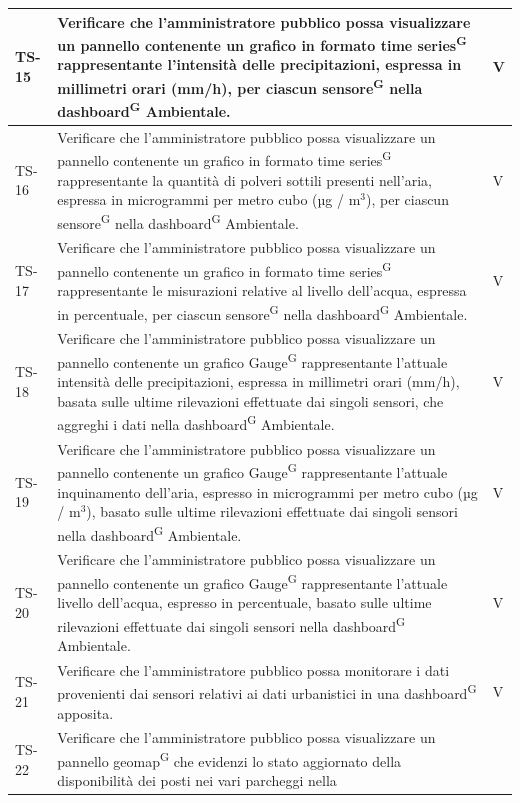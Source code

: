 \documentclass[8pt]{article}
\newcommand{\glossterm}[1]{#1\textsuperscript{G}} %
\begin{document}
\begin{longtable}{|>{\centering}p{2cm}|>{\RaggedRight}m{12cm}|>{\centering\arraybackslash}p{2cm}|}
    \hline
    TS-15 & Verificare che l'amministratore pubblico possa visualizzare un pannello contenente
    un grafico in formato \glossterm{time series} rappresentante l'intensità delle precipitazioni,
    espressa in millimetri orari (mm/h), per ciascun \glossterm{sensore} nella \glossterm{dashboard} Ambientale.
    & V \\
    \hline
    TS-16 & Verificare che l'amministratore pubblico possa visualizzare un pannello contenente
    un grafico in formato \glossterm{time series} rappresentante la quantità di polveri sottili presenti nell'aria,
    espressa in microgrammi per metro cubo (µg / $\mbox{m}^{\mbox{3}}$), per ciascun \glossterm{sensore} nella \glossterm{dashboard} Ambientale.
    & V \\
    \hline
    TS-17 & Verificare che l'amministratore pubblico possa visualizzare un pannello contenente
    un grafico in formato \glossterm{time series} rappresentante le misurazioni relative al livello dell'acqua,
    espressa in percentuale, per ciascun \glossterm{sensore} nella \glossterm{dashboard} Ambientale.
    & V \\
    \hline
    TS-18 & Verificare che l'amministratore pubblico possa visualizzare un pannello contenente
    un grafico \glossterm{Gauge} rappresentante l'attuale intensità delle precipitazioni,
    espressa in millimetri orari (mm/h), basata sulle ultime rilevazioni effettuate dai singoli sensori, che aggreghi i dati nella \glossterm{dashboard} Ambientale.
    & V \\
    \hline
    TS-19 & Verificare che l'amministratore pubblico possa visualizzare un pannello contenente
    un grafico \glossterm{Gauge} rappresentante l'attuale inquinamento dell'aria,
    espresso in microgrammi per metro cubo (µg / $\mbox{m}^{\mbox{3}}$), basato sulle ultime rilevazioni effettuate dai singoli sensori nella \glossterm{dashboard} Ambientale.
    & V \\
    \hline
    TS-20 & Verificare che l'amministratore pubblico possa visualizzare un pannello contenente
    un grafico \glossterm{Gauge} rappresentante l'attuale livello dell'acqua,
    espresso in percentuale, basato sulle ultime rilevazioni effettuate dai singoli sensori nella \glossterm{dashboard} Ambientale.
    & V \\
    \hline
    TS-21 & Verificare che l'amministratore pubblico possa monitorare i dati provenienti
    dai sensori relativi ai dati urbanistici in una \glossterm{dashboard} apposita.
    & V \\
    \hline
    TS-22 & Verificare che l'amministratore pubblico possa visualizzare un pannello \glossterm{geomap} che evidenzi lo stato aggiornato della disponibilità dei posti nei vari parcheggi nella

\end{longtable}
\end{document}
